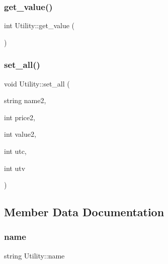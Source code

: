 \mbox{\label{classUtility_a1e0457f8715e5894e63dd100dd9e8294}} 
\subsubsection{\texorpdfstring{get\+\_\+value()}{get\_value()}}
{\footnotesize\ttfamily int Utility\+::get\+\_\+value (\begin{DoxyParamCaption}{ }\end{DoxyParamCaption})}

\mbox{\label{classUtility_abe96d66bedd9c441feb772826a9057b6}} 
\subsubsection{\texorpdfstring{set\+\_\+all()}{set\_all()}}
{\footnotesize\ttfamily void Utility\+::set\+\_\+all (\begin{DoxyParamCaption}\item[{string}]{name2,  }\item[{int}]{price2,  }\item[{int}]{value2,  }\item[{int}]{utc,  }\item[{int}]{utv }\end{DoxyParamCaption})}



\subsection{Member Data Documentation}
\mbox{\label{classUtility_ab8c4475f3e8914e7433ae2d6f4b90ea3}} 
\subsubsection{\texorpdfstring{name}{name}}
{\footnotesize\ttfamily string Utility\+::name\hspace{0.3cm}{\ttfamily [private]}}

\mbox{\label{classUtility_a6530849c80df2049f03561e334c16c84}} 
